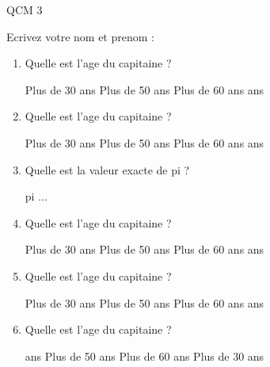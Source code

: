\documentclass[a4paper, 11pt]{article}
\begin{document}
	QCM 3
	
	Ecrivez votre nom et prenom :
	\begin{qcm}
		\begin{enumerate}
			\item Quelle est l'age du capitaine ?
			\begin{tabenum} [1)]
				\tabenumitem Plus de 30 ans
				\tabenumitem Plus de 50 ans
				\tabenumitem Plus de 60 ans
				 ans
			\end{tabenum}
		\vspace{5mm}

			\item Quelle est l'age du capitaine ?
			\begin{tabenum} [1)]
				\tabenumitem Plus de 30 ans
				\tabenumitem Plus de 50 ans
				\tabenumitem Plus de 60 ans
				 ans
			\end{tabenum}
		\vspace{5mm}

			\item Quelle est la valeur exacte de pi ?
			\begin{tabenum} [1)]
				\tabenumitem pi
				...
			\end{tabenum}
		\vspace{5mm}

			\item Quelle est l'age du capitaine ?
			\begin{tabenum} [1)]
				\tabenumitem Plus de 30 ans
				\tabenumitem Plus de 50 ans
				\tabenumitem Plus de 60 ans
				 ans
			\end{tabenum}
		\vspace{5mm}

			\item Quelle est l'age du capitaine ?
			\begin{tabenum} [1)]
				\tabenumitem Plus de 30 ans
				\tabenumitem Plus de 50 ans
				\tabenumitem Plus de 60 ans
				 ans
			\end{tabenum}
		\vspace{5mm}

			\item Quelle est l'age du capitaine ?
			\begin{tabenum} [1)]
				 ans
				\tabenumitem Plus de 50 ans
				\tabenumitem Plus de 60 ans
				\tabenumitem Plus de 30 ans
			\end{tabenum}
		\vspace{5mm}

		\end{enumerate}
	\end{qcm}
	\newpage
	
\end{document}
